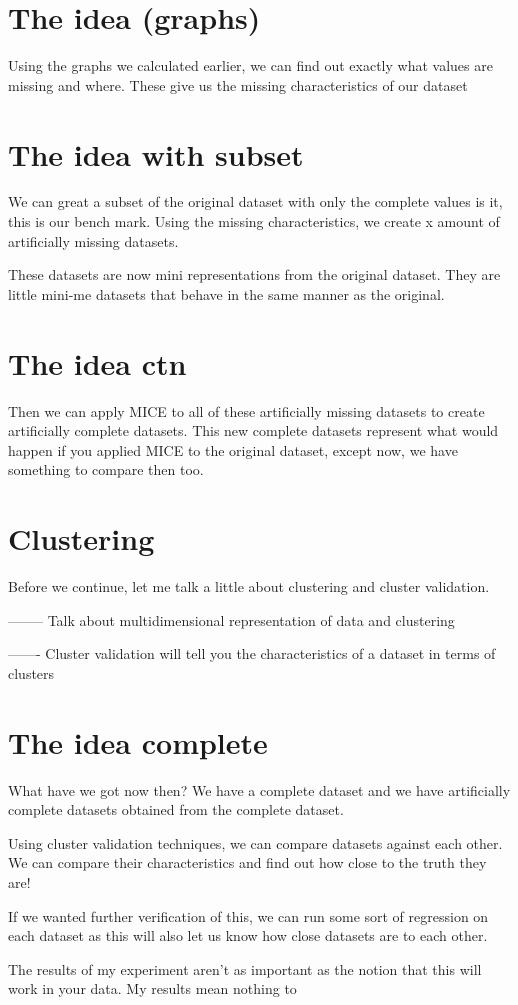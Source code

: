 \documentclass{report}
\begin{document}
\section*{The idea (graphs)}
Using the graphs we calculated earlier, we can find out exactly what values are missing and where. These give us the missing characteristics of our dataset

\section*{The idea with subset}
We can great a subset of the original dataset with only the complete values is it, this is our bench mark. Using the missing characteristics, we create x amount of artificially missing datasets. 

These datasets are now mini representations from the original dataset. They are little mini-me datasets that behave in the same manner as the original. 

\section*{The idea ctn}
Then we can apply MICE to all of these artificially missing datasets to create artificially complete datasets. This new complete datasets represent what would happen if you applied MICE to the original dataset, except now, we have something to compare then too. 

\section*{Clustering}
Before we continue, let me talk a little about clustering and cluster validation. 

-------- Talk about multidimensional representation of data and clustering

------- Cluster validation will tell you the characteristics of a dataset in terms of clusters

\section*{The idea complete}
What have we got now then? We have a complete dataset and we have artificially complete datasets obtained from the complete dataset. 

Using cluster validation techniques, we can compare datasets against each other. We can compare their characteristics and find out how close to the truth they are! 

If we wanted further verification of this, we can run some sort of regression on each dataset as this will also let us know how close datasets are to each other. 

The results of my experiment aren't as important as the notion that this will work in your data. My results mean nothing to 
\end{document}
